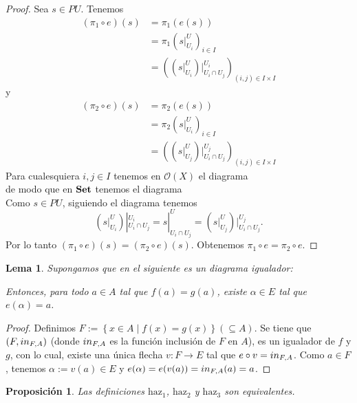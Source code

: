 \documentclass[letterpaper]{article} %
\newtheorem{Prop}{Proposición}
\newtheorem{Lema}{Lema}
\newcommand{\Set}{\normalfont{\textbf{Set}}}
\begin{document}
   \begin{proof}
      Sea $s\in PU$. Tenemos
      $$
      \begin{aligned}
         (\pi_1\circ e)(s) &= \pi_1(e(s)) \\
                           &= \pi_1 \left(s|^U_{U_i}\right)_{i\in I} \\
                           &= \left(\left(s|^U_{U_i}\right)|^{U_i}_{U_i\cap U_j}\right)_{\left(i,j\right)\in I\times I}
      \end{aligned}
      $$
      y
      $$
      \begin{aligned}
         (\pi_2\circ e)(s) &= \pi_2(e(s)) \\
                           &= \pi_2 \left(s|^U_{U_i}\right)_{i\in I} \\
                           &= \left(\left(s|^U_{U_j}\right)|^{U_j}_{U_i\cap U_j}\right)_{\left(i,j\right)\in I\times I}
      \end{aligned}
      $$
   Para cualesquiera $i,j\in I$ tenemos en $\mathcal{O}(X)$ el diagrama\\ 
   
   de modo que en $\Set$ tenemos el diagrama\\
   
   Como $s\in PU$, siguiendo el diagrama tenemos
   $$
   \left(s|^U_{U_i}\right)|^{U_i}_{U_i \cap U_j}=s|^U_{U_i\cap U_j}=\left(s|^U_{U_j}\right)|^{U_j}_{U_i\cap U_j}.
   $$
   Por lo tanto $(\pi_1\circ e)(s)=(\pi_2\circ e)(s)$. Obtenemos $\pi_1\circ e=\pi_2\circ e$.
   \end{proof}

   \begin{Lema}\label{Lema:Igualadores2}
      Supongamos que en  el siguiente es un diagrama igualador:
      
      Entonces, para todo $a\in A$ tal que $f(a)=g(a)$, existe $\alpha\in E$ tal que $e(\alpha)=a$.
   \end{Lema}
   \begin{proof}
      Definimos $F:=\left\lbrace x\in A\mid f(x)=g(x)\right\rbrace (\subseteq A)$. Se tiene que $(F,\normalfont{in}_{F,A})$ (donde $\normalfont{in}_{F,A}$ es la función inclusión de $F$ en $A$), es un igualador de $f$ y $g$, con lo cual, existe una única flecha $v:F\to E$ tal que $e\circ v=\normalfont{in}_{F,A}$. Como $a\in F$, tenemos $\alpha:=v(a)\in E$ y $e(\alpha)=e(v(a))=\normalfont{in}_{F,A}(a)=a$. 

   \end{proof}

   \begin{Prop}
      Las definiciones ${\text{haz}}_1$, ${\text{haz}}_2$ y ${\text{haz}}_3$ son equivalentes. 
   \end{Prop}
\end{document}
